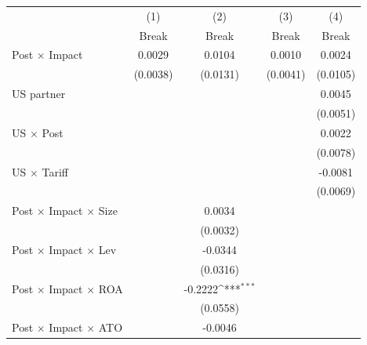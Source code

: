 {
\def\sym#1{\ifmmode^{#1}\else\(^{#1}\)\fi}
\begin{tabular}{l*{4}{c}}
\toprule
            &\multicolumn{1}{c}{(1)}&\multicolumn{1}{c}{(2)}&\multicolumn{1}{c}{(3)}&\multicolumn{1}{c}{(4)}\\
            &\multicolumn{1}{c}{Break}&\multicolumn{1}{c}{Break}&\multicolumn{1}{c}{Break}&\multicolumn{1}{c}{Break}\\
\midrule
Post \(\times\) Impact&      0.0029         &      0.0104         &      0.0010         &      0.0024         \\
            &    (0.0038)         &    (0.0131)         &    (0.0041)         &    (0.0105)         \\
US partner  &                     &                     &                     &      0.0045         \\
            &                     &                     &                     &    (0.0051)         \\
US \(\times\) Post&                     &                     &                     &      0.0022         \\
            &                     &                     &                     &    (0.0078)         \\
US \(\times\) Tariff&                     &                     &                     &     -0.0081         \\
            &                     &                     &                     &    (0.0069)         \\
Post \(\times\) Impact \(\times\) Size&                     &      0.0034         &                     &                     \\
            &                     &    (0.0032)         &                     &                     \\
Post \(\times\) Impact \(\times\) Lev&                     &     -0.0344         &                     &                     \\
            &                     &    (0.0316)         &                     &                     \\
Post \(\times\) Impact \(\times\) ROA&                     &     -0.2222\sym{***}&                     &                     \\
            &                     &    (0.0558)         &                     &                     \\
Post \(\times\) Impact \(\times\) ATO&                     &     -0.0046         &                     &                     \\

\end{tabular}}
